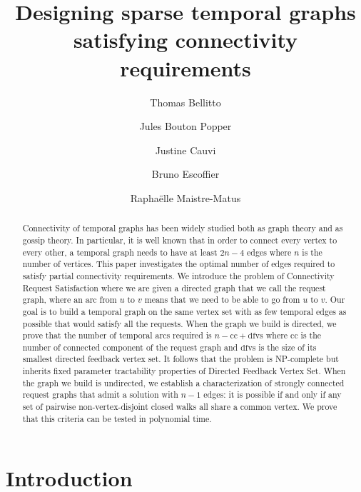 \documentclass[11pt]{article}%
\title{Designing sparse temporal graphs satisfying connectivity requirements} %
\author[1]{Thomas Bellitto}
\author[1]{Jules Bouton Popper}
\author[1,2]{Justine Cauvi}
\author[1]{Bruno Escoffier}
\author[1]{Raphaëlle Maistre-Matus}
\affil[1]{Sorbonne Universit\'e, CNRS, LIP6, F-75005 Paris, France}
\affil[2]{\'Ecole Normale Supérieure de Lyon, Lyon, France}
\date{}
\begin{document}
\maketitle

\begin{abstract}
Connectivity of temporal graphs has been widely studied both as graph theory and as gossip theory. In particular, it is well known that in order to connect every vertex to every other, a temporal graph needs to have at least $2n-4$ edges where $n$ is the number of vertices. This paper investigates the optimal number of edges required to satisfy partial connectivity requirements. We introduce the problem of Connectivity Request Satisfaction where we are given a directed graph that we call the request graph, where an arc from $u$ to $v$ means that we need to be able to go from $u$ to $v$. Our goal is to build a temporal graph on the same vertex set with as few temporal edges as possible that would satisfy all the requests. When the graph we build is directed, we prove that the number of temporal arcs required is $n-\mathrm{cc}+\mathrm{dfvs}$ where $\mathrm{cc}$ is the number of connected component of the request graph and $\mathrm{dfvs}$ is the size of its smallest directed feedback vertex set. It follows that the problem is NP-complete but inherits fixed parameter tractability properties of Directed Feedback Vertex Set. When the graph we build is undirected, we establish a characterization of strongly connected request graphs that admit a solution with $n-1$ edges: it is possible if and only if any set of pairwise non-vertex-disjoint closed walks all share a common vertex. We prove that this criteria can be tested in polynomial time.
 
\end{abstract}

\section{Introduction}
\label{sec:introduction}
\end{document}
